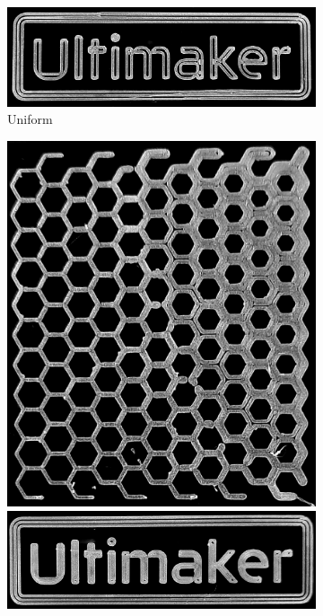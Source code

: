 \begin{figure}
\begin{subfigure}{\figwidth}
\includegraphics[width=\figwidth]{sources-applications-P3-print-UM-naive-edited.png}
\caption{Uniform}\label{print_naive}
\end{subfigure}
\begin{subfigure}{\figwidth}\centering
\includegraphics[height=\figheight]{sources-applications-P3-print-hex-center-edited.png}
\includegraphics[width=\figwidth]{sources-applications-P3-print-UM-center-edited.png}

\end{subfigure}
\end{figure}
